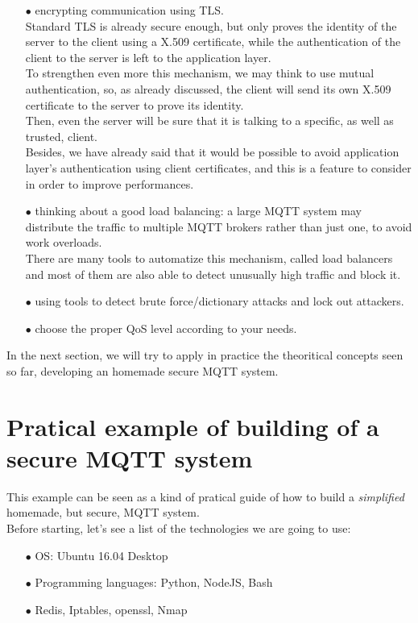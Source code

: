 \documentclass[12pt]{report}
\begin{document}
{\begin{itemize}
\item[$\bullet$] encrypting communication using TLS.\\
Standard TLS is already secure enough, but only proves the identity of the server to the client using a X.509 certificate, while the authentication of the client to the server is left to the application layer.\\
To strengthen even more this mechanism, we may think to use mutual authentication, so, as already discussed, the client will send its own X.509 certificate to the server to prove its identity.\\
Then, even the server will be sure that it is talking to a specific, as well as trusted, client.\\
Besides, we have already said that it would be possible to avoid application layer's authentication using client certificates, and this is a feature to consider in order to improve performances.

\item[$\bullet$] thinking about a good load balancing: a large MQTT system may distribute the traffic to multiple MQTT brokers rather than just one, to avoid work overloads.\\
There are many tools to automatize this mechanism, called load balancers and most of them are also able to detect unusually high traffic and block it.
\item[$\bullet$] using tools to detect brute force/dictionary attacks and lock out attackers.
\item[$\bullet$] choose the proper QoS level according to your needs.\\
\end{itemize}

In the next section, we will try to apply in practice the theoritical concepts seen so far, developing an homemade secure MQTT system.\\

\section{Pratical example of building of a secure MQTT system}
\bigskip
This example can be seen as a kind of pratical guide of how to build a \emph{simplified} homemade, but secure, MQTT system.\\
Before starting, let's see a list of the technologies we are going to use:
\bigskip
\begin{itemize}
\setlength{\itemindent}{+4mm}
\item[$\bullet$] OS: Ubuntu 16.04 Desktop
\item[$\bullet$] Programming languages: Python, NodeJS, Bash
\item[$\bullet$] Redis, Iptables, openssl, Nmap\\
\end{itemize}

}
\end{document}
